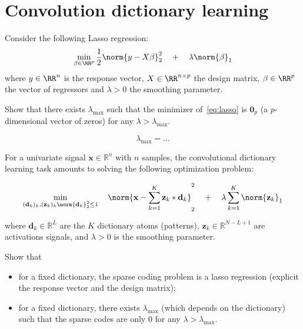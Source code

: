 \documentclass[11pt]{article}
\begin{document}
\section{Convolution dictionary learning}

\begin{exercise}
Consider the following Lasso regression:
\begin{equation}\label{eq:lasso}
    \min_{\beta\in\RR^p} \frac{1}{2}\norm{y-X\beta}^2_2 \quad + \quad \lambda \norm{\beta}_1
\end{equation}
where $y\in\RR^n$ is the response vector, $X\in\RR^{n\times p}$ the design matrix, $\beta\in\RR^p$ the vector of regressors and $\lambda>0$ the smoothing parameter.

Show that there exists $\lambda_{\max}$ such that the minimizer of~\eqref{eq:lasso} is $\mathbf{0}_p$ (a $p$-dimensional vector of zeros) for any $\lambda > \lambda_{\max}$. 
\end{exercise}

\begin{solution}  %

\begin{equation}
    \lambda_{\max} = \dots
\end{equation}

\end{solution}

\begin{exercise}
For a univariate signal $\mathbf{x}\in\mathbb{R}^n$ with $n$ samples, the convolutional dictionary learning task amounts to solving the following optimization problem:

\begin{equation}
\min_{(\mathbf{d}_k)_k, (\mathbf{z}_k)_k \\ \norm{\mathbf{d}_k}_2^2\leq 1} \quad\norm{\mathbf{x} - \sum_{k=1}^K \mathbf{z}_k * \mathbf{d}_k }^2_2 \quad + \quad\lambda \sum_{k=1}^K \norm{\mathbf{z}_k}_1
\end{equation}

where $\mathbf{d}_k\in\mathbb{R}^L$ are the $K$ dictionary atoms (patterns), $\mathbf{z}_k\in\mathbb{R}^{N-L+1}$ are activations signals, and $\lambda>0$ is the smoothing parameter.

Show that
\begin{itemize}
    \item for a fixed dictionary, the sparse coding problem is a lasso regression (explicit the response vector and the design matrix);
    \item for a fixed dictionary, there exists $\lambda_{\max}$ (which depends on the dictionary) such that the sparse codes are only 0 for any $\lambda > \lambda_{\max}$. 
\end{itemize}
\end{exercise}
\end{document}
